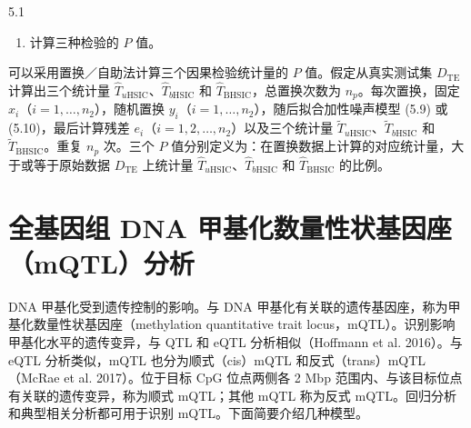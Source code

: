 \begin{bookalgorithm}{5.1}
\begin{enumerate}
\begin{enumerate}[label=(\alph*)]
\begin{enumerate}[label=(\roman*)]
\[
\mathrm{HSIC}_b(X,Y)=\frac1{n^2}\tr(K_xHK_yH),
\]
其中，$H=I_n-\frac1n\mathbf1\mathbf1^T$ 为对行或列进行中心化的中心化矩阵；
\[
\begin{aligned}
\widehat c_b=\frac1{S(S-3)}\Bigl[{}&\tr(\widehat K_x^{(b)}\widehat K_e^{(b)})
+\frac{\mathbf1^T\widehat K_x^{(b)}\mathbf1\mathbf1^T\widehat K_e^{(b)}\mathbf1}{(S-1)(S-2)}\\
&-\frac2{S-2}\mathbf1^T\widehat K_x^{(b)}\widehat K_e^{(b)}\mathbf1\Bigr],
\end{aligned}
\]
其中，$b=1,2,\ldots,n/s$；
\[
\mathrm{BHSIC}=\frac Sn\sum_{b=1}^{n/S}\widehat c_b.
\]
\item 定义三个统计量：
\[
\begin{aligned}
T_{u\mathrm{HSIC}}&=-\log\mathrm{HSIC}_u(X,\varepsilon),\\
T_{b\mathrm{HSIC}}&=-\log\mathrm{HSIC}_b(X,\varepsilon),\\
T_{\mathrm{BHSIC}}&=-\log\mathrm{BHSIC}.
\end{aligned}
\]
\end{enumerate}
\item 计算三种检验的 $P$ 值。
\end{enumerate}
\end{enumerate}
\end{bookalgorithm}

可以采用置换／自助法计算三个因果检验统计量的 $P$ 值。假定从真实测试集 $D_{\mathrm{TE}}$ 计算出三个统计量 $\widehat T_{u\mathrm{HSIC}}$、$\widehat T_{b\mathrm{HSIC}}$ 和 $\widehat T_{\mathrm{BHSIC}}$，总置换次数为 $n_p$。每次置换，固定 $x_i$（$i=1,\ldots,n_2$），随机置换 $y_i$（$i=1,\ldots,n_2$），随后拟合加性噪声模型 (5.9) 或 (5.10)，最后计算残差 $e_i$（$i=1,2,\ldots,n_2$）以及三个统计量 $\widetilde T_{u\mathrm{HSIC}}$、$\widetilde T_{b\mathrm{HSIC}}$ 和 $\widetilde T_{\mathrm{BHSIC}}$。重复 $n_p$ 次。三个 $P$ 值分别定义为：在置换数据上计算的对应统计量，大于或等于原始数据 $D_{\mathrm{TE}}$ 上统计量 $\widehat T_{u\mathrm{HSIC}}$、$\widehat T_{b\mathrm{HSIC}}$ 和 $\widehat T_{\mathrm{BHSIC}}$ 的比例。

\FloatBarrier
\section{全基因组 DNA 甲基化数量性状基因座（mQTL）分析}

DNA 甲基化受到遗传控制的影响。与 DNA 甲基化有关联的遗传基因座，称为甲基化数量性状基因座（methylation quantitative trait locus，mQTL）。识别影响甲基化水平的遗传变异，与 QTL 和 eQTL 分析相似（Hoffmann et al. 2016）。与 eQTL 分析类似，mQTL 也分为顺式（cis）mQTL 和反式（trans）mQTL（McRae et al. 2017）。位于目标 CpG 位点两侧各 2 Mbp 范围内、与该目标位点有关联的遗传变异，称为顺式 mQTL；其他 mQTL 称为反式 mQTL。回归分析和典型相关分析都可用于识别 mQTL。下面简要介绍几种模型。

